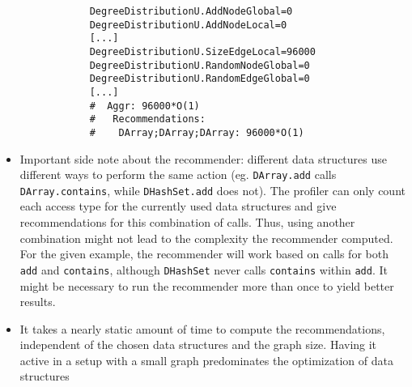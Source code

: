 \begin{itemize}
		\begin{verbatim}
			DegreeDistributionU.AddNodeGlobal=0
			DegreeDistributionU.AddNodeLocal=0
			[...]
			DegreeDistributionU.SizeEdgeLocal=96000
			DegreeDistributionU.RandomNodeGlobal=0
			DegreeDistributionU.RandomEdgeGlobal=0
			[...]
			#  Aggr: 96000*O(1)
			#   Recommendations:
			#    DArray;DArray;DArray: 96000*O(1)
		\end{verbatim}
		
		\item Important side note about the recommender: different data structures use different
			ways to perform the same action (eg. \texttt{DArray.add} calls
			\texttt{DArray.contains}, while \texttt{DHashSet.add} does not). The profiler can only
			count each access type for the currently used data structures and give recommendations
			for this combination of calls. Thus, using another combination might not lead to the
			complexity the recommender computed. For the given example, the recommender will work
			based on calls for both \texttt{add} and \texttt{contains}, although \texttt{DHashSet}
			never calls \texttt{contains} within \texttt{add}. It might be necessary to run the
			recommender more than once to yield better results.
		\item It takes a nearly static amount of time to compute the recommendations,
			independent of the chosen data structures and the graph size. Having it active in a
			setup with a small graph predominates the optimization of data structures
	\end{itemize}

